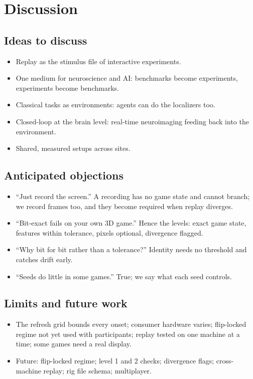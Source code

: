 \documentclass{article}
\begin{document}
\section{Discussion}
\label{sec:discussion}

\subsection{Ideas to discuss}
\begin{itemize}
  \item Replay as the stimulus file of interactive experiments.
  \item One medium for neuroscience and AI: benchmarks become experiments, experiments become benchmarks.
  \item Classical tasks as environments: agents can do the localizers too.
  \item Closed-loop at the brain level: real-time neuroimaging feeding back into the environment.
  \item Shared, measured setups across sites.
\end{itemize}

\subsection{Anticipated objections}
\begin{itemize}
  \item ``Just record the screen.'' A recording has no game state and cannot branch; we record frames too, and they become required when replay diverges.
  \item ``Bit-exact fails on your own 3D game.'' Hence the levels: exact game state, features within tolerance, pixels optional, divergence flagged.
  \item ``Why bit for bit rather than a tolerance?'' Identity needs no threshold and catches drift early.
  \item ``Seeds do little in some games.'' True; we say what each seed controls.
\end{itemize}

\subsection{Limits and future work}
\begin{itemize}
  \item The refresh grid bounds every onset; consumer hardware varies; flip-locked regime not yet used with participants; replay tested on one machine at a time; some games need a real display.
  \item Future: flip-locked regime; level 1 and 2 checks; divergence flags; cross-machine replay; rig file schema; multiplayer.
\end{itemize}
\end{document}

